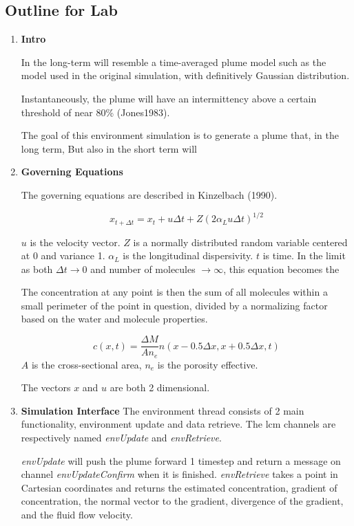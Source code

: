 \documentclass[11pt]{article} %
\begin{document}
\subsection{Outline for Lab}
\begin{enumerate}
\item {\bf Intro}

In the long-term will resemble a time-averaged plume model such as the model used in the original simulation, with definitively Gaussian distribution.

Instantaneously, the plume will have an intermittency above a certain threshold of near 80\% (Jones1983).  


 The goal of this environment simulation is to generate a plume that, in the long term,  But also in the short term will 

\item {\bf Governing Equations} 

The governing equations are described in Kinzelbach (1990). 

$$x_{t+\Delta t} = x_{t} + u\Delta t + Z(2 \alpha_L u\Delta t)^{1/2}$$

$u$ is the velocity vector.  $Z$ is a normally distributed random variable centered at 0 and variance 1.  $\alpha_L$ is the longitudinal dispersivity. $t$ is time.   In the limit as both $\Delta t \rightarrow 0$ and number of molecules $\rightarrow \infty$, this equation becomes the 

The concentration at any point is then the sum of all molecules within a small perimeter of the point in question, divided by a normalizing factor based on the water and molecule properties.  

$$
c(x,t) = \frac{\Delta M}{A n_e} n(x- 0.5 \Delta x,x + 0.5 \Delta x, t)
$$
$A$ is the cross-sectional area, $n_e$ is the porosity effective.


The vectors $x$ and $u$ are both 2 dimensional.  
\item{\bf Simulation Interface}
The environment thread consists of 2 main functionality, environment update and data retrieve. The lcm channels are respectively named {\it envUpdate} and {\it envRetrieve}.

{\it envUpdate} will push the plume forward 1 timestep and return a message on channel {\it envUpdateConfirm} when it is finished.  {\it envRetrieve} takes a point in Cartesian coordinates and returns the estimated concentration, gradient of concentration, the normal vector to the gradient, divergence of the gradient, and the fluid flow velocity.


\end{enumerate}
\end{document}
